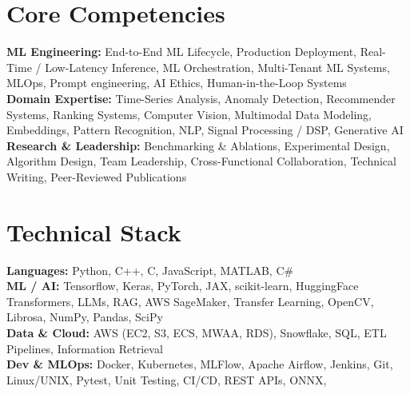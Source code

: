 \documentclass[11pt]{article}
\begin{document}
\section*{Core Competencies}

\textbf{ML Engineering:} End-to-End ML Lifecycle, Production Deployment, Real-Time / Low-Latency Inference, ML Orchestration, Multi-Tenant ML Systems, MLOps, Prompt engineering, AI Ethics, Human-in-the-Loop Systems\\
\textbf{Domain Expertise:} Time-Series Analysis, Anomaly Detection, Recommender Systems, Ranking Systems, Computer Vision, Multimodal Data Modeling, Embeddings, Pattern Recognition, NLP, Signal Processing / DSP, Generative AI\\
\textbf{Research \& Leadership:} Benchmarking \& Ablations, Experimental Design, Algorithm Design, Team Leadership, Cross-Functional Collaboration, Technical Writing, Peer-Reviewed Publications








\section*{Technical Stack}
\textbf{Languages:} Python, C++, C, JavaScript, MATLAB, C\#\\
\textbf{ML / AI:} Tensorflow, Keras, PyTorch, JAX, scikit-learn, HuggingFace Transformers, LLMs, RAG, AWS SageMaker, Transfer Learning, OpenCV, Librosa, NumPy, Pandas, SciPy\\
\textbf{Data \& Cloud:} AWS (EC2, S3, ECS, MWAA, RDS), Snowflake, SQL, ETL Pipelines, Information Retrieval\\
\textbf{Dev \& MLOps:} Docker, Kubernetes, MLFlow, Apache Airflow, Jenkins, Git, Linux/UNIX, Pytest, Unit Testing, CI/CD, REST APIs, ONNX, 
\end{document}
